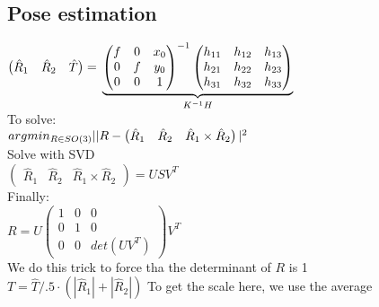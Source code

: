 \subsection*{Pose estimation}
$\begin{pmatrix} \hat{R}_1 & \hat{R}_2 & \hat{T}\end{pmatrix}
=\\
\underbrace{
\begin{pmatrix}
  f & 0 & x_0 \\ 0 & f &y_0\\0 & 0 & 1
\end{pmatrix}^{-1}
\begin{pmatrix}
  h_{11} & h_{12} & h_{13} \\
  h_{21} & h_{22} & h_{23} \\
  h_{31} & h_{32} & h_{33}
\end{pmatrix}
}_{K^{-1} H}
$\\
To solve:\\
$argmin_{R\in SO(3)}\\
||R -
\begin{pmatrix}
  \hat{R}_1 & \hat{R}_2 & \hat{R}_1 \times \hat{R}_2
\end{pmatrix}|^2$\\
Solve with SVD\\
$\begin{pmatrix}
  \hat{R}_1 & \hat{R}_2 & \hat{R}_1 \times \hat{R}_2
\end{pmatrix} = U S V^T$\\
Finally:\\
$R = U
\begin{pmatrix}
  1 & 0 & 0\\
  0 & 1 & 0\\
  0 & 0 & det(U V^T)
\end{pmatrix} V^T$ \\
\alert{We do this trick to force tha the determinant of $R$ is 1}\\
$T = \hat{T}/.5\cdot(|\hat{R}_1|+|\hat{R}_2|)$
\alert{To get the scale here, we use the average}
